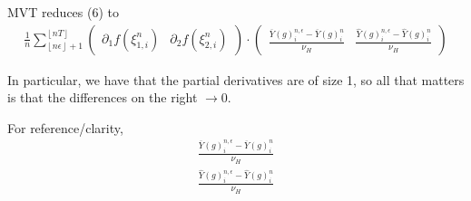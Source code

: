 \documentclass[12pt,letterpaper]{article}
\theoremstyle{definition}
\begin{document}
MVT reduces (6) to
\begin{gather}
  \frac{1}{n}\sum_{\left\lfloor n\epsilon \right\rfloor + 1}^{\left\lfloor nT \right\rfloor} \begin{pmatrix} \partial_1 f(\xi_{1,i}^n) & \partial_2 f(\xi_{2,i}^n) \end{pmatrix} \cdot \begin{pmatrix} \frac{\overline{Y}(g)^{n,\epsilon}_i - \overline{Y}(g)^{n}_i}{\nu_H} & \frac{\widehat{Y}(g)^{n,\epsilon}_i - \widehat{Y}(g)^{n}_i}{\nu_H} \end{pmatrix}
\end{gather}

In particular, we have that the partial derivatives are of size 1, so all that matters is that the differences on the right \(\rightarrow 0\).

For reference/clarity,
\begin{gather}
  \frac{\overline{Y}(g)^{n,\epsilon}_i - \overline{Y}(g)^{n}_i}{\nu_H} \\
  \frac{\widehat{Y}(g)^{n,\epsilon}_i - \widehat{Y}(g)^{n}_i}{\nu_H}
\end{gather}
\end{document}
